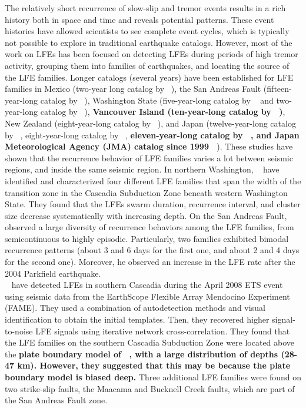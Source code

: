 \documentclass[draft]{agujournal2019}
\begin{document}
The relatively short recurrence of slow-slip and tremor events results in a rich history both in space and time and reveals potential patterns.  These event histories have allowed scientists to see complete event cycles, which is typically not possible to explore in traditional earthquake catalogs. However, most of the work on LFEs has been focused on detecting LFEs during periods of high tremor activity, grouping them into families of earthquakes, and locating the source of the LFE families. Longer catalogs (several years) have been established for LFE families in Mexico (two-year long catalog by ~), the San Andreas Fault (fifteen-year-long catalog by ~), Washington State (five-year-long catalog by ~ and two-year-long catalog by ~), \textbf{Vancouver Island (ten-year-long catalog by ~)}, New Zealand (eight-year-long catalog by ~), and Japan (twelve-year-long catalog by ~, eight-year-long catalog by ~, \textbf{eleven-year-long catalog by ~, and Japan Meteorological Agency (JMA) catalog since 1999 ~\cite{KAT_2003}}). These studies have shown that the recurrence behavior of LFE families varies a lot between seismic regions, and inside the same seismic region. In northern Washington, ~ have identified and characterized four different LFE families that span the width of the transition zone in the Cascadia Subduction Zone beneath western Washington State. They found that the LFEs swarm duration, recurrence interval, and cluster size decrease systematically with increasing depth. On the San Andreas Fault, ~ observed a large diversity of recurrence behaviors among the LFE families, from semicontinuous to highly episodic. Particularly, two families exhibited bimodal recurrence patterns (about 3 and 6 days for the first one, and about 2 and 4 days for the second one). Moreover, he observed an increase in the LFE rate after the 2004 Parkfield earthquake. \\

~ have detected LFEs in southern Cascadia during the April 2008 ETS event using seismic data from the EarthScope Flexible Array Mendocino Experiment (FAME). They used a combination of autodetection methods and visual identification to obtain the initial templates. Then, they recovered higher signal-to-noise LFE signals using iterative network cross-correlation. They found that the LFE families on the southern Cascadia Subduction Zone were located above the \textbf{plate boundary model of ~, with a large distribution of depths (28-47 km). However, they suggested that this may be because the plate boundary model is biased deep.} Three additional LFE families were found on two strike-slip faults, the Maacama and Bucknell Creek faults, which are part of the San Andreas Fault zone. \\
\end{document}
